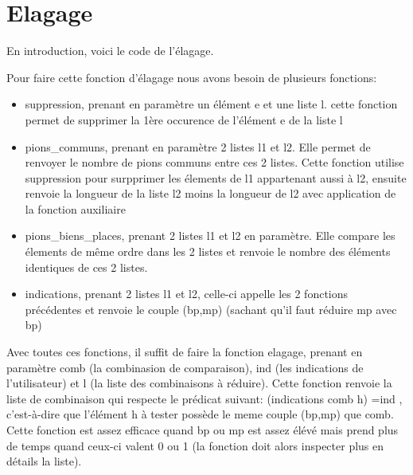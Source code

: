 \documentclass[a4paper,twoside,12pt]{report}
\newcommand{\moncode}[1]{\begin{center}
                        
                        \end{center}}
\begin{document}
\section{Elagage}
En introduction, voici le code de l'élagage.
\moncode{elag.ml}
Pour faire cette fonction d'élagage nous avons besoin de plusieurs fonctions:
\begin{itemize}
\item suppression, prenant en paramètre un élément e et une liste l. cette fonction permet de supprimer la 1ère occurence de l'élément e de la liste l
\item pions\_communs, prenant en paramètre 2 listes l1 et l2. Elle permet de renvoyer le nombre de pions communs entre ces 2 listes. Cette fonction utilise suppression pour surpprimer les élements de l1 appartenant aussi à l2, ensuite renvoie la longueur de la liste l2 moins la longueur de l2 avec application de la fonction auxiliaire
\item pions\_biens\_places, prenant 2 listes l1 et l2 en paramètre. Elle compare les élements de même ordre dans les 2 listes et renvoie le nombre des éléments identiques de ces 2 listes.
\item indications, prenant 2 listes l1 et l2, celle-ci appelle les 2 fonctions précédentes et renvoie le couple (bp,mp) (sachant qu'il faut réduire mp avec bp)
\end{itemize}
\par
Avec toutes ces fonctions, il suffit de faire la fonction elagage, prenant en paramètre comb (la combinasion de comparaison), ind (les indications de l'utilisateur) et l (la liste des combinaisons à réduire). Cette fonction renvoie la liste de combinaison qui respecte le prédicat suivant: (indications comb h) =ind , c'est-à-dire que l'élément h à tester possède le meme couple (bp,mp) que comb. Cette fonction est assez efficace quand bp ou mp est assez élévé mais prend plus de temps quand ceux-ci valent 0 ou 1 (la fonction doit alors inspecter plus en détails la liste).

%
\end{document}
